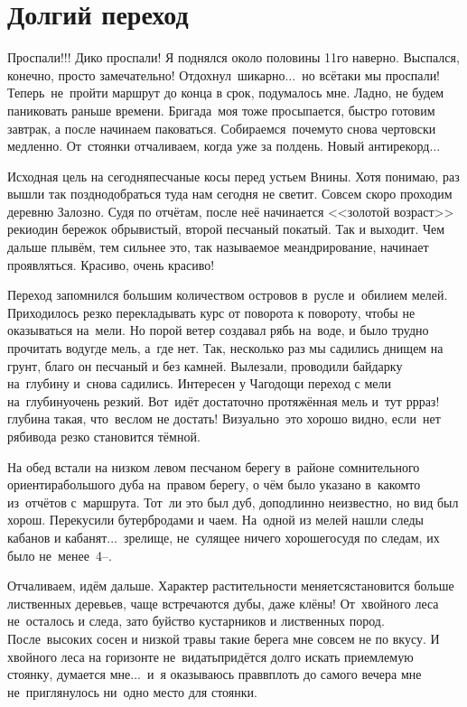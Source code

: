 \chapter{Долгий переход}

Проспали!!! Дико проспали! Я поднялся около половины 11\sdash го наверно. Выспался, конечно, просто замечательно! Отдохнул~шикарно$\ldots$~но всё\sdash таки мы проспали! Теперь~не~пройти маршрут до конца в срок, подумалось мне. Ладно, не будем паниковать раньше времени. Бригада~моя тоже просыпается, быстро готовим завтрак, а после начинаем паковаться. Собираемся~почему\sdash то снова чертовски медленно. От~стоянки отчаливаем, когда уже за полдень. Новый антирекорд$\ldots$

Исходная цель на сегодня\mdash песчаные косы перед устьем Внины. Хотя понимаю, раз вышли так поздно\mdash добраться туда нам сегодня не светит. Совсем скоро проходим деревню Залозно. Судя по отчётам, после неё начинается <<золотой возраст>> реки\mdash один бережок обрывистый, второй песчаный покатый. Так и выходит. Чем дальше плывём, тем сильнее это, так называемое меандрирование, начинает проявляться. Красиво, очень красиво! 

Переход запомнился большим количеством островов в~русле и~обилием мелей. Приходилось резко перекладывать курс от поворота к повороту, чтобы не оказываться на~мели. Но порой ветер создавал рябь на~воде, и было трудно прочитать воду\mdash где мель, а~где нет. Так, несколько раз мы садились днищем на грунт, благо он песчаный и без камней. Вылезали, проводили байдарку на~глубину и~снова садились. Интересен у Чагодощи переход с мели на~глубину\mdash очень резкий. Вот~идёт достаточно протяжённая мель и~тут р\sdash р\sdash раз!\mdash глубина такая, что~веслом не достать! Визуально~это хорошо видно, если~нет ряби\mdash вода резко становится тёмной.

На обед встали на низком левом песчаном берегу в~районе сомнительного ориентира\mdash большого дуба на~правом берегу, о чём было указано в~каком\sdash то из~отчётов с~маршрута. Тот~ли это был дуб, доподлинно неизвестно, но вид был хорош. Перекусили бутербродами и чаем. На~одной из мелей нашли следы кабанов и кабанят$\ldots$~зрелище, не~сулящее ничего хорошего\mdash судя по следам, их было не~менее~4\thinspace--. 

Отчаливаем, идём дальше. Характер растительности меняется\mdash становится больше лиственных деревьев, чаще встречаются дубы, даже клёны! От~хвойного леса не~осталось и следа, зато буйство кустарников и лиственных пород. После~высоких сосен и низкой травы такие берега мне совсем не по вкусу. И хвойного леса на горизонте не~видать\mdash придётся долго искать приемлемую стоянку, думается мне$\ldots$~и~я оказываюсь прав\mdash вплоть до самого вечера мне не~приглянулось ни~одно место для стоянки.

